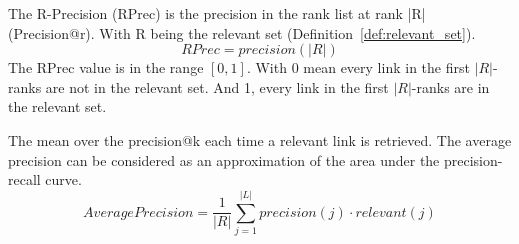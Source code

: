 \begin{definition}
  The R-Precision (RPrec) is the precision in the rank list at rank |R| (Precision@r).
  With R being the relevant set (Definition~\ref{def:relevant_set}).
  \begin{equation}
    RPrec = precision(|R|)
  \end{equation}
  The RPrec value is in the range $\left[0, 1\right]$.
  With 0 mean every link in the first $|R|$-ranks are not in the relevant set.
  And 1, every link in the first $|R|$-ranks are in the relevant set.
\end{definition}

\begin{definition}
  The mean over the precision@k each time a relevant link is retrieved.
  The average precision can be considered as an approximation of the area under the precision-recall curve.
  \begin{equation}
    AveragePrecision = \frac{1}{|R|} \sum_{j=1}^{|L|} precision(j) \cdot relevant(j)
  \end{equation}
\end{definition}

